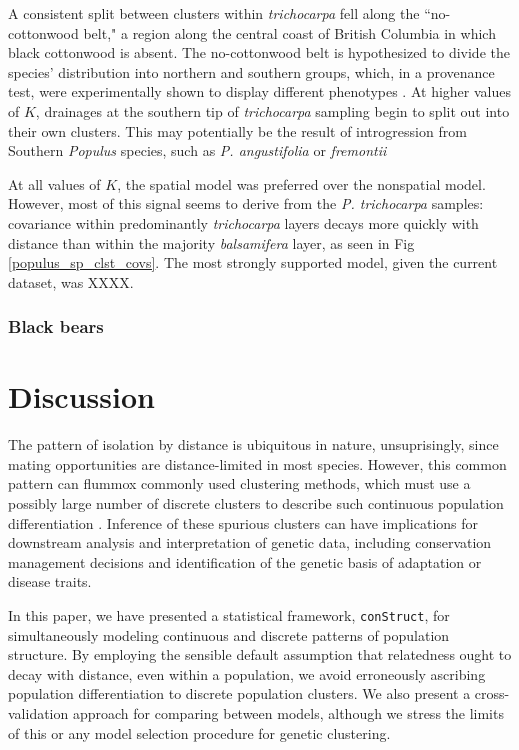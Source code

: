 \documentclass[12pt]{article}
\newcommand{\tri}{\textit{trichocarpa}}
\newcommand{\bals}{\textit{balsamifera}}
\newcommand{\plr}[1]{{\it\color{purple}{(#1)}}}
\begin{document}
A consistent split between clusters within \tri{} fell along the ``no-cottonwood belt," 
a region along the central coast of British Columbia in which black cottonwood is absent. 
The no-cottonwood belt is hypothesized to divide the species' distribution 
into northern and southern groups, which, in a provenance test, 
were experimentally shown to display different phenotypes 
\citep[pathogen resistance][]{xie2009,xie2012}.  
At higher values of $K$, drainages at the southern tip of \tri{} sampling 
begin to split out into their own clusters.  
\plr{cut this if we pick lower $K$? Or add a disclaimer?}
This may potentially be the result of introgression from Southern \textit{Populus} species, 
such as \textit{P. angustifolia} or \textit{fremontii} \citep{Zhou2012,geraldes_etal_2014}

At all values of $K$, the spatial model was preferred over the nonspatial model.
However, most of this signal seems to derive from the \textit{P. trichocarpa} samples:
covariance within predominantly \tri{} layers decays more quickly with distance
than within the majority \bals{} layer, as seen in Fig \ref{populus_sp_clst_covs}.
The most strongly supported model, given the current dataset, was XXXX.


\subsubsection*{Black bears}


\section*{Discussion}

The pattern of isolation by distance is ubiquitous in nature,
unsuprisingly, since mating opportunities are distance-limited in most species.
However,
this common pattern can flummox commonly used clustering methods, 
which must use a possibly large number of discrete clusters
to describe such continuous population differentiation .
Inference of these spurious clusters can have implications for 
downstream analysis and interpretation of genetic data, 
including conservation management decisions and 
identification of the genetic basis of adaptation or disease traits.

In this paper, we have presented a statistical framework, \texttt{conStruct}, for simultaneously 
modeling continuous and discrete patterns of population structure.
By employing the sensible default assumption
that relatedness ought to decay with distance, even within a population, 
we avoid erroneously ascribing population differentiation to discrete population clusters.
We also present a cross-validation approach for comparing between models, 
although we stress the limits of this or any model selection procedure for genetic clustering.
\end{document}
